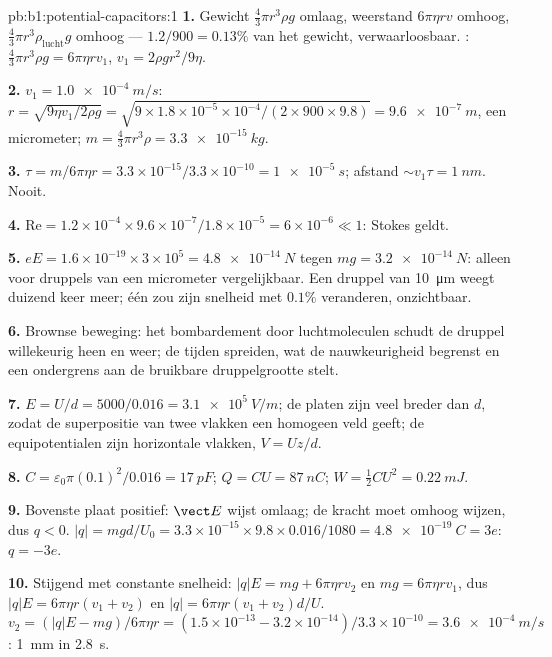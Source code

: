\begin{solution}{pb:b1:potential-capacitors:1}
\textbf{1.} Gewicht $\tfrac43\pi r^3\rho g$ omlaag, weerstand $6\pi\eta rv$ omhoog,
 $\tfrac43\pi r^3\rho_{\text{lucht}}g$ omhoog --- $1.2/900 = 0.13\%$ van het
gewicht, verwaarloosbaar. : $\tfrac43\pi r^3\rho g = 6\pi\eta rv_1$, $v_1 =
2\rho gr^2/9\eta$.

\textbf{2.} $v_1 = \qty{1.0e-4}{m/s}$: $r = \sqrt{9\eta v_1/2\rho g} = \sqrt{9 \times
1.8 \times 10^{-5} \times 10^{-4}/(2 \times 900 \times 9.8)} = \qty{9.6e-7}{m}$, een
micrometer; $m = \tfrac43\pi r^3\rho = \qty{3.3e-15}{kg}$.

\textbf{3.} $\tau = m/6\pi\eta r = 3.3 \times 10^{-15}/3.3 \times 10^{-10} = \qty{1e-5}{s}$;
afstand $\sim v_1\tau = \qty{1}{nm}$. Nooit.

\textbf{4.} $\mathrm{Re} = 1.2 \times 10^{-4} \times 9.6 \times 10^{-7}/1.8 \times 10^{-5} =
6 \times 10^{-6} \ll 1$: Stokes geldt.

\textbf{5.} $eE = 1.6 \times 10^{-19} \times 3 \times 10^5 = \qty{4.8e-14}{N}$ tegen
$mg = \qty{3.2e-14}{N}$: alleen voor druppels van een micrometer vergelijkbaar. Een druppel van \qty{10}{\micro m}
weegt duizend keer meer; één  zou zijn
snelheid met $0.1\%$ veranderen, onzichtbaar.

\textbf{6.} Brownse beweging: het bombardement door luchtmoleculen schudt
de druppel willekeurig heen en weer; de tijden spreiden, wat de nauwkeurigheid begrenst en
een ondergrens aan de bruikbare druppelgrootte stelt.

\textbf{7.} $E = U/d = 5000/0.016 = \qty{3.1e5}{V/m}$; de platen zijn veel breder dan
$d$, zodat de superpositie van twee vlakken een homogeen veld geeft; de
equipotentialen zijn horizontale vlakken, $V = Uz/d$.

\textbf{8.} $C = \varepsilon_0\pi(0.1)^2/0.016 = \qty{17}{pF}$; $Q = CU = \qty{87}{nC}$;
$W = \tfrac12CU^2 = \qty{0.22}{mJ}$.

\textbf{9.} Bovenste plaat positief: $\vect E$ wijst omlaag; de kracht moet
omhoog wijzen, dus $q < 0$. $|q| = mgd/U_0 = 3.3 \times 10^{-15} \times 9.8 \times 0.016/
1080 = \qty{4.8e-19}{C} = 3e$: $q = -3e$.

\textbf{10.} Stijgend met constante snelheid: $|q|E = mg + 6\pi\eta rv_2$ en $mg =
6\pi\eta rv_1$, dus $|q|E = 6\pi\eta r(v_1 + v_2)$ en $|q| = 6\pi\eta r(v_1 +
v_2)d/U$. $v_2 = (|q|E - mg)/6\pi\eta r = (1.5 \times 10^{-13} - 3.2 \times 10^{-14})/
3.3 \times 10^{-10} = \qty{3.6e-4}{m/s}$: \qty{1}{mm} in \qty{2.8}{s}.


\end{solution}
